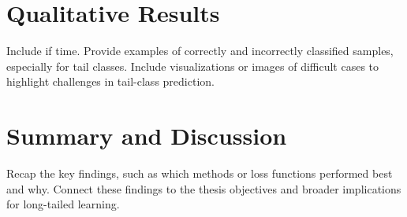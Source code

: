 \section{Qualitative Results}
Include if time.
Provide examples of correctly and incorrectly classified samples, especially for tail classes.
Include visualizations or images of difficult cases to highlight challenges in tail-class prediction.

\section{Summary and Discussion}
Recap the key findings, such as which methods or loss functions performed best and why.
Connect these findings to the thesis objectives and broader implications for long-tailed learning.